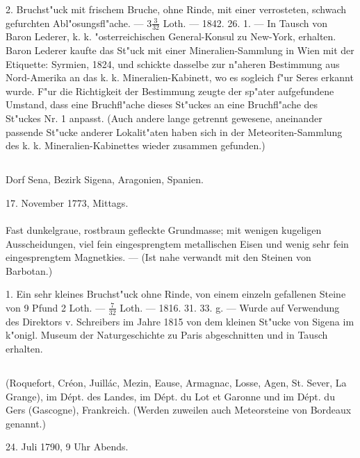 \documentclass[a4paper, 11pt, oneside, polutonikogreek, german]{article}
\begin{document}
2. Bruchst"uck mit frischem Bruche, ohne Rinde, mit einer verrosteten, schwach gefurchten Abl"osungsfl"ache. --- $3\frac{3}{32}$ Loth. --- 1842. 26. 1. --- In Tausch von Baron Lederer, k. k. "osterreichischen General-Konsul zu New-York, erhalten. Baron Lederer kaufte das St"uck mit einer Mineralien-Sammlung in Wien mit der Etiquette: Syrmien, 1824, und schickte dasselbe zur n"aheren Bestimmung aus Nord-Amerika an das k. k. Mineralien-Kabinett, wo es sogleich f"ur Seres erkannt wurde. F"ur die Richtigkeit der Bestimmung zeugte der sp"ater aufgefundene Umstand, dass eine Bruchfl"ache dieses St"uckes an eine Bruchfl"ache des St"uckes Nr. 1 anpasst. (Auch andere lange getrennt gewesene, aneinander passende St"ucke anderer Lokalit"aten haben sich in der Meteoriten-Sammlung des k. k. Mineralien-Kabinettes wieder zusammen gefunden.)
\subsection{}
\begin{center}

Dorf Sena, Bezirk Sigena, Aragonien, Spanien.

17. November 1773, Mittags.
\end{center}
\paragraph{}
Fast dunkelgraue, rostbraun gefleckte Grundmasse; mit wenigen kugeligen Ausscheidungen, viel fein eingesprengtem metallischen Eisen und wenig sehr fein eingesprengtem Magnetkies. --- (Ist nahe verwandt mit den Steinen von Barbotan.)

1. Ein sehr kleines Bruchst"uck ohne Rinde, von einem einzeln gefallenen Steine von 9 Pfund 2 Loth. --- $\frac{7}{32}$ Loth. --- 1816. 31. 33. g. --- Wurde auf Verwendung des Direktors v. Schreibers im Jahre 1815 von dem kleinen St"ucke von Sigena im k"onigl. Museum der Naturgeschichte zu Paris abgeschnitten und in Tausch erhalten.
\subsection{}
\begin{center}

(Roquefort, Créon, Juillác, Mezin, Eause, Armagnac, Losse, Agen, St. Sever, La Grange), im Dépt. des Landes, im Dépt. du Lot et Garonne und im Dépt. du Gers (Gascogne), Frankreich. (Werden zuweilen auch Meteorsteine von Bordeaux genannt.)

24. Juli 1790, 9 Uhr Abends.
\end{center}
\end{document}
